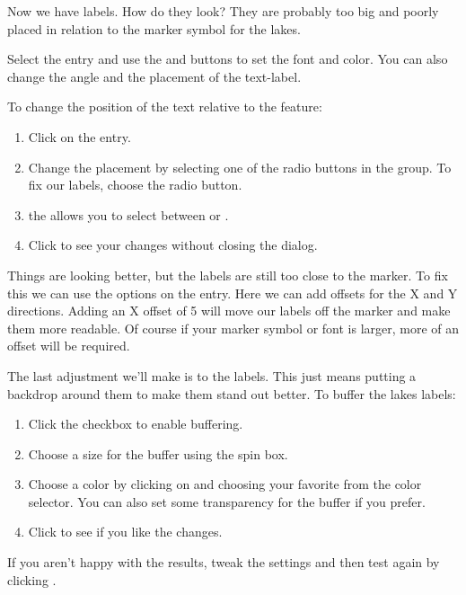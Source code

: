 Now we have labels. How do they look? They are probably too big and poorly
placed in relation to the marker symbol for the lakes.

Select the  entry and use the  and 
buttons to set the font and color. You can also change the angle and the
placement of the text-label.

To change the position of the text relative to the feature:

\begin{enumerate}
\item Click on the  entry.
\item Change the placement by selecting one of the radio buttons
in the  group. To fix our labels, choose the
 radio button.
\item the  allows you to select between
 or .
\item Click  to see your changes without closing the dialog.
\end{enumerate}

Things are looking better, but the labels are still too close to the marker. To
fix this we can use the options on the  entry. Here we can add
offsets for the X and Y directions. Adding an X offset of 5 will move our
labels off the marker and make them more readable. Of course if your marker
symbol or font is larger, more of an offset will be required.

The last adjustment we'll make is to  the labels. This just means
putting a backdrop around them to make them stand out better. To buffer the
lakes labels:

\begin{enumerate}
\item Click the  checkbox to enable buffering.
\item Choose a size for the buffer using the spin box.
\item Choose a color by clicking on  and choosing your
  favorite from the color selector. You can also set some transparency for the
  buffer if you prefer.
\item Click  to see if you like the changes.
\end{enumerate}

If you aren't happy with the results, tweak the settings and then test again
by clicking .


